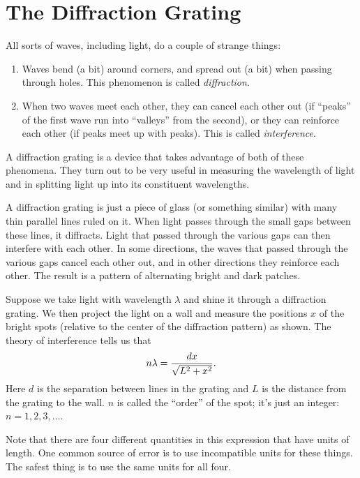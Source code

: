 \section{The Diffraction Grating}

\makelabheader

\answerspace{1in}

All sorts of waves, including light, do a couple 
of strange things:
\begin{enumerate}
\item Waves bend (a bit) around corners, and spread
out (a bit) when passing through holes. 
This phenomenon is called {\it diffraction}.
\item When two waves meet each other, they
can cancel each other out (if ``peaks'' of the
first wave run into ``valleys'' from the second), 
or they can reinforce each other (if peaks meet up with peaks).
This is called {\it interference}.
\end{enumerate}

A diffraction grating is a device
that takes advantage of both of these phenomena.  They turn
out to be very useful in measuring the wavelength
of light and in splitting light up into its constituent
wavelengths.  

A diffraction grating is just a piece of glass (or something similar)
with many thin parallel lines ruled on it.  When light passes through
the small gaps between these lines, it diffracts.  Light that passed
through the various gaps can then interfere with each other.  In some
directions, the waves that passed through the various gaps cancel each
other out, and in other directions they reinforce each other.  The
result is a pattern of alternating bright and dark patches.

Suppose we take light with wavelength $\lambda$ and
shine it through a diffraction grating.  We then
project the light on a wall and measure the 
positions $x$ of the bright spots (relative to the
center of the diffraction pattern) as shown.  The theory of 
interference tells us that 
\begin{displaymath} n\lambda = {dx\over \sqrt{L^2+x^2}}.  \end{displaymath}
Here $d$ is the separation between lines in the grating and $L$
is the distance from the grating to the wall.  $n$ is called the
``order'' of the spot; it's just an integer: $n=1,2,3,\ldots$.

Note that there are four different quantities in this expression that
have units of length.  One common source of error is to
use incompatible units for these things.  The safest thing is
to use the same units for all four.

